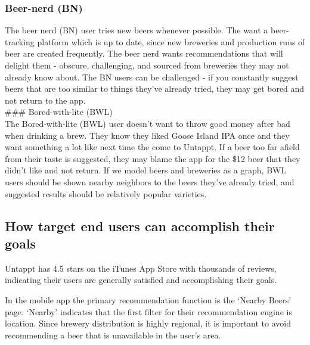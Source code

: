 \documentclass[journal=jacsat,manuscript=article]{achemso}
\begin{document}
\subsubsection{Beer-nerd (BN)}\label{beer-nerd-bn}

The beer nerd (BN) user tries new beers whenever possible. The want a
beer-tracking platform which is up to date, since new breweries and
production runs of beer are created frequently. The beer nerd wants
recommendations that will delight them - obscure, challenging, and
sourced from breweries they may not already know about. The BN users can
be challenged - if you constantly suggest beers that are too similar to
things they've already tried, they may get bored and not return to the
app.\\
\#\#\# Bored-with-lite (BWL)\\
The Bored-with-lite (BWL) user doesn't want to throw good money after
bad when drinking a brew. They know they liked Goose Island IPA once and
they want something a lot like next time the come to Untappt. If a beer
too far afield from their taste is suggested, they may blame the app for
the \$12 beer that they didn't like and not return. If we model beers
and breweries as a graph, BWL users should be shown nearby neighbors to
the beers they've already tried, and suggested results should be
relatively popular varieties.

\subsection{How target end users can accomplish their
goals}\label{how-target-end-users-can-accomplish-their-goals}

Untappt has 4.5 stars on the iTunes App Store with thousands of reviews,
indicating their users are generally satisfied and accomplishing their
goals.

In the mobile app the primary recommendation function is the `Nearby
Beers' page. `Nearby' indicates that the first filter for their
recommendation engine is location. Since brewery distribution is highly
regional, it is important to avoid recommending a beer that is
unavailable in the user's area.
\end{document}
